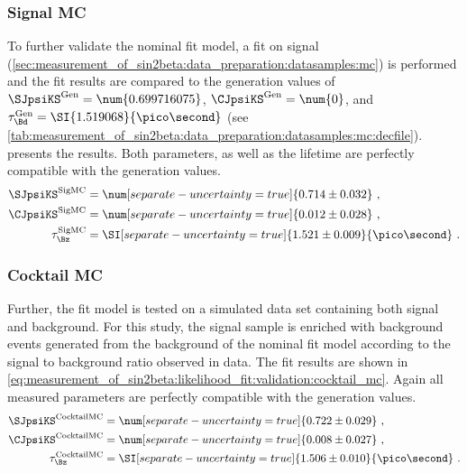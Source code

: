 \subsubsection{Signal \acs*{MC}}
\label{sec:measurement_of_sin2beta:likelihood_fit:validation:signal_mc}

To further validate the nominal fit model, a fit on signal \MC
(\cref{sec:measurement_of_sin2beta:data_preparation:datasamples:mc}) is
performed and the fit results are compared to the generation values of
$\SJpsiKS^{\text{Gen}} = \num{0.699716075}$, $\CJpsiKS^{\text{Gen}} = \num{0}$,
and $\tau_{\Bd}^{\text{Gen}} = \SI{1.519068}{\pico\second}$ (see
\cref{tab:measurement_of_sin2beta:data_preparation:datasamples:mc:decfile}).
 presents
the results. Both \CP parameters, as well as the \Bd lifetime are perfectly
compatible with the generation values.
%
\begin{equation}\label{eq:measurement_of_sin2beta:likelihood_fit:validation:signal_mc}
\begin{split}
  \SJpsiKS^{\text{SigMC}}   &= \num[separate-uncertainty=true]{0.714 \pm 0.032} \ , \\
  \CJpsiKS^{\text{SigMC}}   &= \num[separate-uncertainty=true]{0.012 \pm 0.028} \ , \\
  \tau_{\Bz}^{\text{SigMC}} &= \SI[separate-uncertainty=true]{1.521  \pm 0.009}{\pico\second} \ . \\
\end{split}
\end{equation}

\subsubsection{Cocktail \acs*{MC}}
\label{sec:measurement_of_sin2beta:likelihood_fit:validation:cocktail_mc}

Further, the fit model is tested on a simulated data set containing both signal
and background. For this study, the signal \MC sample is enriched with background
events generated from the background \PDF of the nominal fit model according to
the signal to background ratio observed in data. The fit results are shown in
\cref{eq:measurement_of_sin2beta:likelihood_fit:validation:cocktail_mc}. Again
all measured parameters are perfectly compatible with the generation values.
%
\begin{equation}\label{eq:measurement_of_sin2beta:likelihood_fit:validation:cocktail_mc}
\begin{split}
  \SJpsiKS^{\text{CocktailMC}}   &= \num[separate-uncertainty=true]{0.722 \pm 0.029}  \ , \\
  \CJpsiKS^{\text{CocktailMC}}   &= \num[separate-uncertainty=true]{0.008 \pm 0.027}  \ , \\
  \tau_{\Bz}^{\text{CocktailMC}} &= \SI[separate-uncertainty=true]{1.506  \pm 0.010}{\pico\second} \ . \\
\end{split}
\end{equation}

